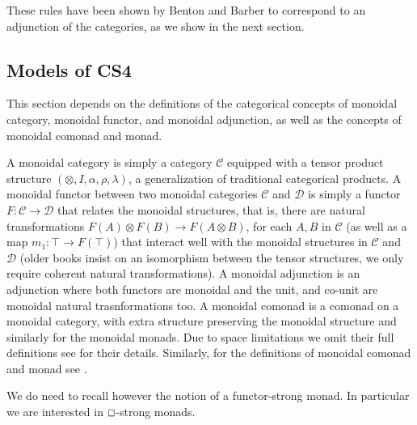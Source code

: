 \documentclass{article}
\renewcommand{\Box}{\oblong}
\newcommand{\cat}[1]{\mathcal{#1}}
\begin{document}
These rules have been shown by Benton \cite{benton1995} and Barber to correspond to an adjunction of the categories, as we show in the next section.  

\subsection{Models of CS4}
\label{subsec:single_adjoint_model_of_cs4}

This section depends on the definitions of the
categorical concepts of monoidal category, monoidal functor, and
monoidal adjunction, as well as the concepts of monoidal comonad and monad. 

A monoidal category is simply a category $\cat{C}$  equipped with a tensor product structure $(\otimes, I, \alpha, \rho, \lambda)$, a generalization of traditional categorical products. A monoidal functor between two monoidal categories $\cat{C}$ and $\cat{D}$ is simply a functor $F\colon \cat{C} \to \cat{D}$ that relates the monoidal structures, that is, there are natural transformations  $F(A)\otimes F(B)\to F(A \otimes B)$, for each $A,B$ in $\cat{C}$ (as well as a map $m_1\colon \top \to F(\top)$) that interact well with the monoidal structures  in $\cat{C}$ and  $\cat{D}$ (older books insist on an isomorphism between the tensor structures, we only require coherent natural transformations). A monoidal adjunction is an adjunction  where both functors are monoidal and the unit, and co-unit are monoidal natural trasnformations too. A monoidal comonad is a comonad on a monoidal category, with extra structure preserving the monoidal structure and similarly for the monoidal monads.
Due to space limitations we omit their full
definitions see \cite{benton1995} for their details.
Similarly, for the definitions of monoidal comonad and monad see
\cite{CS4}.

We do need to recall however the notion of a functor-strong monad. In particular we are interested in $\Box$-strong monads.
\end{document}
